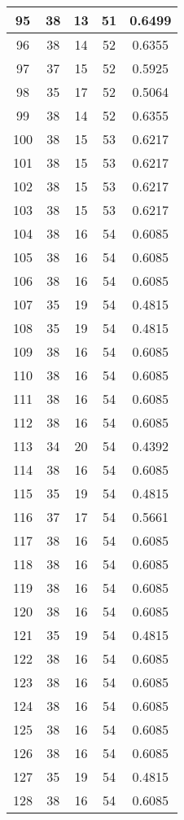 \documentclass[letterpaper, 12pt]{article}
\begin{document}
\begin{longtable}{|c|c|c|c|c|}
\hline
95 & 38 & 13 & 51 & 0.6499 \\
\hline
96 & 38 & 14 & 52 & 0.6355 \\
\hline
97 & 37 & 15 & 52 & 0.5925 \\
\hline
98 & 35 & 17 & 52 & 0.5064 \\
\hline
99 & 38 & 14 & 52 & 0.6355 \\
\hline
100 & 38 & 15 & 53 & 0.6217 \\
\hline
101 & 38 & 15 & 53 & 0.6217 \\
\hline
102 & 38 & 15 & 53 & 0.6217 \\
\hline
103 & 38 & 15 & 53 & 0.6217 \\
\hline
104 & 38 & 16 & 54 & 0.6085 \\
\hline
105 & 38 & 16 & 54 & 0.6085 \\
\hline
106 & 38 & 16 & 54 & 0.6085 \\
\hline
107 & 35 & 19 & 54 & 0.4815 \\
\hline
108 & 35 & 19 & 54 & 0.4815 \\
\hline
109 & 38 & 16 & 54 & 0.6085 \\
\hline
110 & 38 & 16 & 54 & 0.6085 \\
\hline
111 & 38 & 16 & 54 & 0.6085 \\
\hline
112 & 38 & 16 & 54 & 0.6085 \\
\hline
113 & 34 & 20 & 54 & 0.4392 \\
\hline
114 & 38 & 16 & 54 & 0.6085 \\
\hline
115 & 35 & 19 & 54 & 0.4815 \\
\hline
116 & 37 & 17 & 54 & 0.5661 \\
\hline
117 & 38 & 16 & 54 & 0.6085 \\
\hline
118 & 38 & 16 & 54 & 0.6085 \\
\hline
119 & 38 & 16 & 54 & 0.6085 \\
\hline
120 & 38 & 16 & 54 & 0.6085 \\
\hline
121 & 35 & 19 & 54 & 0.4815 \\
\hline
122 & 38 & 16 & 54 & 0.6085 \\
\hline
123 & 38 & 16 & 54 & 0.6085 \\
\hline
124 & 38 & 16 & 54 & 0.6085 \\
\hline
125 & 38 & 16 & 54 & 0.6085 \\
\hline
126 & 38 & 16 & 54 & 0.6085 \\
\hline
127 & 35 & 19 & 54 & 0.4815 \\
\hline
128 & 38 & 16 & 54 & 0.6085 \\

\end{longtable}
\end{document}
